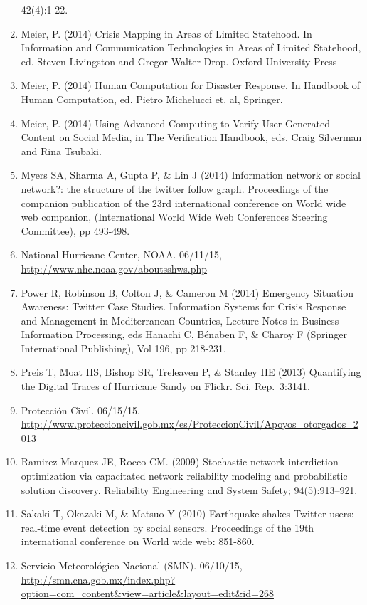 \documentclass[]{article}
\begin{document}
\begin{enumerate}
  42(4):1-22.
\item
  Meier, P. (2014) Crisis Mapping in Areas of Limited Statehood. In
  Information and Communication Technologies in Areas of Limited
  Statehood, ed. Steven Livingston and Gregor Walter-Drop. Oxford
  University Press
\item
  Meier, P. (2014) Human Computation for Disaster Response. In Handbook
  of Human Computation, ed. Pietro Michelucci et. al, Springer.
\item
  Meier, P. (2014) Using Advanced Computing to Verify User-Generated
  Content on Social Media, in The Verification Handbook, eds. Craig
  Silverman and Rina Tsubaki.
\item
  Myers SA, Sharma A, Gupta P, \& Lin J (2014) Information network or
  social network?: the structure of the twitter follow graph.
  Proceedings of the companion publication of the 23rd international
  conference on World wide web companion, (International World Wide Web
  Conferences Steering Committee), pp 493-498.
\item
  National Hurricane Center, NOAA. 06/11/15,
  \url{http://www.nhc.noaa.gov/aboutsshws.php}
\item
  Power R, Robinson B, Colton J, \& Cameron M (2014) Emergency Situation
  Awareness: Twitter Case Studies. Information Systems for Crisis
  Response and Management in Mediterranean Countries, Lecture Notes in
  Business Information Processing, eds Hanachi C, Bénaben F, \& Charoy F
  (Springer International Publishing), Vol 196, pp 218-231.
\item
  Preis T, Moat HS, Bishop SR, Treleaven P, \& Stanley HE (2013)
  Quantifying the Digital Traces of Hurricane Sandy on Flickr. Sci.
  Rep.~3:3141.
\item
  Protección Civil. 06/15/15,
  \url{http://www.proteccioncivil.gob.mx/es/ProteccionCivil/Apoyos_otorgados_2013}
\item
  Ramirez-Marquez JE, Rocco CM. (2009) Stochastic network interdiction
  optimization via capacitated network reliability modeling and
  probabilistic solution discovery. Reliability Engineering and System
  Safety; 94(5):913--921.
\item
  Sakaki T, Okazaki M, \& Matsuo Y (2010) Earthquake shakes Twitter
  users: real-time event detection by social sensors. Proceedings of the
  19th international conference on World wide web: 851-860.
\item
  Servicio Meteorológico Nacional (SMN). 06/10/15,
  \url{http://smn.cna.gob.mx/index.php?option=com_content\&view=article\&layout=edit\&id=268}

\end{enumerate}
\end{document}
